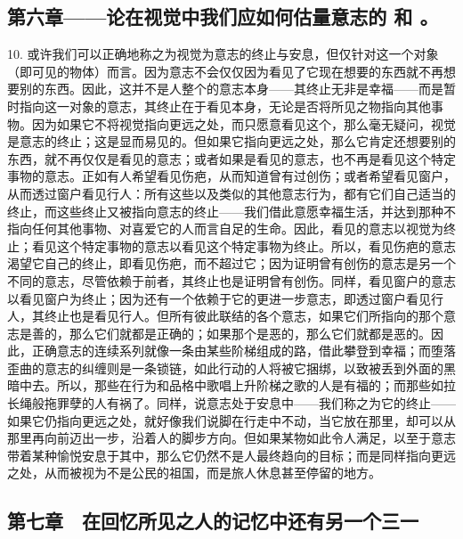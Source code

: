 
\subsection{第六章——论在视觉中我们应如何估量意志的  和 。}

10. 或许我们可以正确地称之为视觉为意志的终止与安息，但仅针对这一个对象（即可见的物体）而言。因为意志不会仅仅因为看见了它现在想要的东西就不再想要别的东西。因此，这并不是人整个的意志本身——其终止无非是幸福——而是暂时指向这一对象的意志，其终止在于看见本身，无论是否将所见之物指向其他事物。因为如果它不将视觉指向更远之处，而只愿意看见这个，那么毫无疑问，视觉是意志的终止；这是显而易见的。但如果它指向更远之处，那么它肯定还想要别的东西，就不再仅仅是看见的意志；或者如果是看见的意志，也不再是看见这个特定事物的意志。正如有人希望看见伤疤，从而知道曾有过创伤；或者希望看见窗户，从而透过窗户看见行人：所有这些以及类似的其他意志行为，都有它们自己适当的终止，而这些终止又被指向意志的终止——我们借此意愿幸福生活，并达到那种不指向任何其他事物、对喜爱它的人而言自足的生命。因此，看见的意志以视觉为终止；看见这个特定事物的意志以看见这个特定事物为终止。所以，看见伤疤的意志渴望它自己的终止，即看见伤疤，而不超过它；因为证明曾有创伤的意志是另一个不同的意志，尽管依赖于前者，其终止也是证明曾有创伤。同样，看见窗户的意志以看见窗户为终止；因为还有一个依赖于它的更进一步意志，即透过窗户看见行人，其终止也是看见行人。但所有彼此联结的各个意志，如果它们所指向的那个意志是善的，那么它们就都是正确的；如果那个是恶的，那么它们就都是恶的。因此，正确意志的连续系列就像一条由某些阶梯组成的路，借此攀登到幸福；而堕落歪曲的意志的纠缠则是一条锁链，如此行动的人将被它捆绑，以致被丢到外面的黑暗中去。所以，那些在行为和品格中歌唱上升阶梯之歌的人是有福的；而那些如拉长绳般拖罪孽的人有祸了。同样，说意志处于安息中——我们称之为它的终止——如果它仍指向更远之处，就好像我们说脚在行走中不动，当它放在那里，却可以从那里再向前迈出一步，沿着人的脚步方向。但如果某物如此令人满足，以至于意志带着某种愉悦安息于其中，那么它仍然不是人最终趋向的目标；而是同样指向更远之处，从而被视为不是公民的祖国，而是旅人休息甚至停留的地方。\par


\subsection{第七章　在回忆所见之人的记忆中还有另一个三一}

